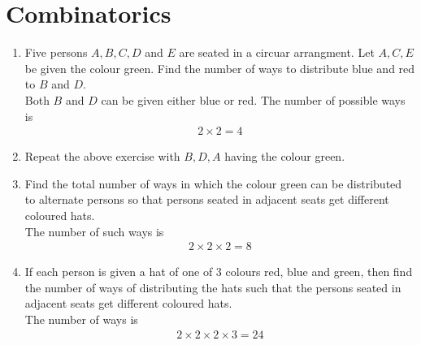 \documentclass[journal,12pt,twocolumn]{IEEEtran}
\renewcommand\thesection{\arabic{section}}
\begin{document}
\section{Combinatorics}
\begin{enumerate}[label=\thesection.\arabic*
,ref=\thesection.\theenumi]
\item Five persons $A, B, C, D $ and $E$ are seated in a circuar arrangment. Let $A, C, E$ be given the colour green. Find the number of ways to distribute blue and red to $B$ and $D$.
\\
\solution Both $B$  and $D$ can be given either blue or red.  The number of possible ways is
\begin{align}
\label{eq:qp2_10_ace_g}
2\times 2 = 4
\end{align}
\item Repeat the above exercise with $B,D, A$ having the colour green.
\item Find the total number of ways in which the colour green can be distributed to alternate persons so that persons seated in adjacent seats get different coloured hats.
\\
\solution The number of such ways is
\begin{align}
\label{eq:qp2_10_g}
2\times 2 \times 2= 8
\end{align}
\item  If each person  is given a hat of one of 3 colours red, blue and green, then find the number of ways of distributing the hats such that the persons seated in adjacent seats get different coloured hats.
\\
\solution The number of ways is 
\begin{align}
\label{eq:qp2_10_sol}
2\times 2 \times 2 \times 3= 24
\end{align}
\end{enumerate}
\end{document}
